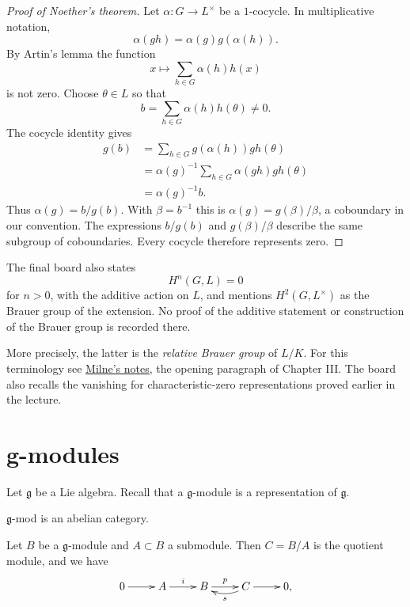 \begin{proof}[Proof of Noether's theorem]
Let $\alpha:G\to L^{\times}$ be a
$1$-cocycle. In multiplicative notation,
$$
\alpha(gh)=\alpha(g)g(\alpha(h)).
$$
By Artin's lemma the function
$$
x\longmapsto\sum_{h\in G}\alpha(h)h(x)
$$
is not zero. Choose $\theta\in L$ so that
$$
b=\sum_{h\in G}\alpha(h)h(\theta)\ne0.
$$
The cocycle identity gives
$$
\begin{aligned}
g(b)&=\sum_{h\in G}g(\alpha(h))gh(\theta)\\
&=\alpha(g)^{-1}
\sum_{h\in G}\alpha(gh)gh(\theta)\\
&=\alpha(g)^{-1}b.
\end{aligned}
$$
Thus $\alpha(g)=b/g(b)$. With
$\beta=b^{-1}$ this is
$\alpha(g)=g(\beta)/\beta$, a coboundary
in our convention. The expressions
$b/g(b)$ and $g(\beta)/\beta$ describe
the same subgroup of coboundaries.
Every cocycle therefore represents zero.
\end{proof}

\begin{remark}
\label{remark-galois-closing-4-sept}
The final board also states
$$
H^n(G,L)=0
$$
for $n>0$, with the additive action on
$L$, and mentions $H^2(G,L^{\times})$
as the Brauer group of the extension.
No proof of the additive statement or
construction of the Brauer group is
recorded there.

More precisely, the latter is the
\emph{relative Brauer group} of $L/K$.
For this terminology see
\href{https://www.jmilne.org/math/%
CourseNotes/CFT.pdf}{Milne's notes},
the opening paragraph of Chapter III.
The board also recalls the vanishing for
characteristic-zero representations proved
earlier in the lecture.
\end{remark}


\section{g-modules}
\label{section-g-modules}

\noindent
Let $\mathfrak{g}$ be a Lie algebra.
Recall that a $\mathfrak{g}$-module
is a representation of $\mathfrak{g}$.

\begin{proposition}
\label{proposition-g-mod-abelian-category}
$\mathfrak{g}$-mod is an abelian category.
\end{proposition}

\noindent
Let $B$ be a $\mathfrak{g}$-module and
$A \subset B$ a submodule.
Then $C = B/A$ is the quotient module, and
we have
\begin{equation}
\label{equation-ses-gmod}
\xymatrix{
0\ar[r]
&A\ar[r]^i
&B\ar[r]^p
&C\ar[r]\ar@/^.5pc/[l]^s
&0,
}
\end{equation}

